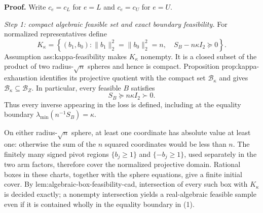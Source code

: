 \textbf{Proof.}
Write \(c_e=c_L\) for \(e=L\) and \(c_e=c_U\) for \(e=U\).

\emph{Step 1: compact algebraic feasible set and exact boundary feasibility.}
For normalized representatives define
\[
K_\kappa=
\left\{(b_1,b_0):
\lVert b_1\rVert_2^2=\lVert b_0\rVert_2^2=n,
\quad S_B-n\kappa I_2\succeq0
\right\}.
\]
Assumption ass:kappa-feasibility makes \(K_\kappa\) nonempty.  It is a closed subset of the product of two radius-\(\sqrt n\) spheres and hence is compact.  Proposition prop:kappa-exhaustion identifies its projective quotient with the compact set \(\mathcal B_\kappa\) and gives \(\mathcal B_\kappa\subseteq\mathcal B_Z\).  In particular, every feasible \(B\) satisfies
\[
S_B\succeq n\kappa I_2\succ0. \tag{1}
\]
Thus every inverse appearing in the loss is defined, including at the equality boundary \(\lambda_{\min}(n^{-1}S_B)=\kappa\).

On either radius-\(\sqrt n\) sphere, at least one coordinate has absolute value at least one: otherwise the sum of the \(n\) squared coordinates would be less than \(n\).  The finitely many signed pivot regions \(\{b_j\ge1\}\) and \(\{-b_j\ge1\}\), used separately in the two arm factors, therefore cover the normalized projective domain.  Rational boxes in these charts, together with the sphere equations, give a finite initial cover.  By lem:algebraic-box-feasibility-cad, intersection of every such box with \(K_\kappa\) is decided exactly; a nonempty intersection yields a real-algebraic feasible sample even if it is contained wholly in the equality boundary in (1).

